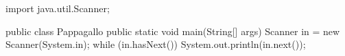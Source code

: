 \begin{unipdcode}[language=Java]
import java.util.Scanner;

public class Pappagallo {
    public static void main(String[] args) {
        Scanner in = new Scanner(System.in);
        while (in.hasNext()) {
            System.out.println(in.next());
        }
    }
}
\end{unipdcode}
